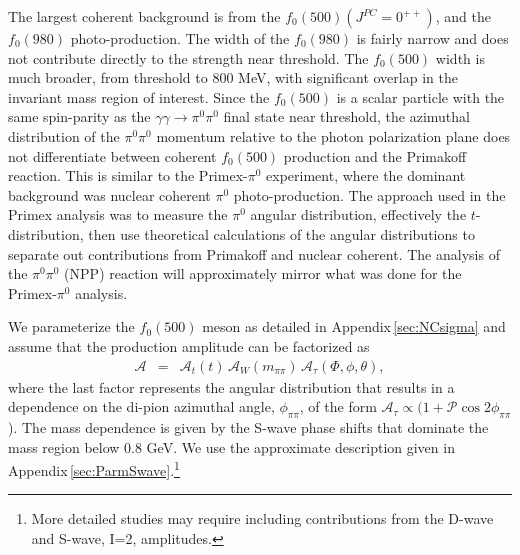  The largest coherent background is  
from the $f_0(500)(J^{PC}=0^{++})$, and the $f_0(980)$ photo-production.  The width of the
$f_0(980)$ is fairly narrow and does not contribute directly to the strength near threshold.
The $f_0(500)$ width is much
broader, from threshold to 800 MeV, with significant overlap in the
invariant mass region of interest.  Since the $f_0(500)$ is a scalar
particle with the same spin-parity as the $\gamma \gamma \rightarrow
\pi^0\pi^0$ final state near threshold, the azimuthal distribution of the $\pi^0\pi^0$ momentum relative to the
photon polarization plane does not differentiate between coherent
$f_0(500)$ production and the Primakoff reaction.  
This is similar to the Primex-$\pi^0$ experiment, where the dominant background was
nuclear coherent $\pi^0$ photo-production.  The approach used in the
Primex analysis was to measure the $\pi^0$ angular distribution,
effectively the $t$-distribution, then use theoretical calculations of
the angular distributions to separate out contributions from Primakoff
and nuclear coherent. The analysis of the $\pi^0\pi^0$ (NPP) reaction
will approximately mirror what was done for the Primex-$\pi^0$
analysis.  

We parameterize the $f_{0}(500)$ meson as detailed in Appendix\,\ref{sec:NCsigma} and assume that the production amplitude can be factorized as
\begin{eqnarray}
\mathcal{A} & = & \mathcal{A}_t(t) \, \mathcal{A}_W(m_{\pi\pi}) \, \mathcal{A}_\tau(\Phi, \phi, \theta),
\end{eqnarray}
where the last factor represents the angular distribution that results in a 
dependence on the di-pion azimuthal angle, $\phi_{\pi\pi}$, of the form $\mathcal{A}_\tau \propto (1 + \mathcal{P} \cos{2\phi_{\pi\pi}}$). 
The mass dependence is given by the S-wave phase shifts that dominate the mass region below 0.8 GeV. We use the approximate description given in 
Appendix\,\ref{sec:ParmSwave}.\footnote{More detailed studies may require including contributions from the D-wave and S-wave, I=2, amplitudes.} 

